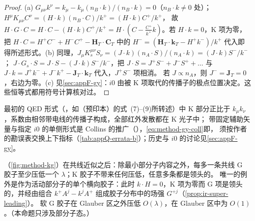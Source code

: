 \begin{proof}
(a) $G_{\mu\nu}k^\nu=k_\mu-k_\mu(n_B\cdot k)/(n_B\cdot k)=0$（$n_B\cdot k\neq0$ 处）；$H^\mu K_{\mu\nu}C^\nu=(H\cdot k)(n_B\cdot C)/k^+=(H\cdot k)C^+/k^+$，
故 $H\cdot G\cdot C=H\cdot C-(H\cdot k)C^+/k^+=H\cdot(C-\frac{C^+}{k^+}k)$。若 $H\cdot k=0$，K 项为零，把 $H\cdot C=H^+C^-+H^-C^+-\mathbf H_T\cdot\mathbf C_T$ 中的
$H^-=(\mathbf H_T\cdot\mathbf k_T-H^+k^-)/k^+$ 代入即得所述形式。(b) 同理，$J_\mu K_s^{\mu\nu}S_\nu=(J\cdot k)(n_A\cdot S)/(n_A\cdot k)=(J\cdot k)S^-/k^-$；
$J\cdot G_s\cdot S=J\cdot S-(J\cdot k)S^-/k^-$，把 $J\cdot S=J^+S^-+J^-S^++\ldots$ 与 $J\cdot k=J^+k^-+J^-k^+-\mathbf J_T\cdot\mathbf k_T$ 代入，$J^+S^-$ 项相消。
若 $J\propto n_A$，则 $J^-=\mathbf J_T=0$，右边为零。(c) 见\cref{sec:appF-gy}：$i0$ 由被 K 项取代的传播子的极点位置决定。这些恒等式都用符号计算核对过。%
\end{proof}

最初的 QED 形式（\cite{GrammerYennie1973}，如\cite{SenIndumathiChoudhury2019}（预印本）的式~(7)--(9)所转述）中 K 部分正比于 $k_\mu k_\nu$，系数由相邻带电线的传播子构成，全部红外发散都在 K 光子中；
带固定辅助矢量与指定 $i0$ 的单侧形式是 Collins 的推广（\cite[第~5.5.6、10.6、11.9.3~节]{Collins2011}），\cref{eq:method-gy-coll}即\cite[式~(11.4)--(11.6)，第~402~页]{Collins2011}，
须按作者的勘误表交换上下指标（\cref{tab:appQ-errata-b}）；历史与 $i0$ 的讨论见\cref{sec:appF-gy}。


\begin{proposition}\label{prop:method-gy-suppression}
（\cref{fig:method-kg}）在共线近似之后：除最小部分子内容之外，每多一条共线 G 胶子至少压低一个 $\lambda$；K 胶子不带来任何压低，任意多条都是领头的。
唯一的例外是作为活动部分子的单个横向胶子：此时 $k\cdot H=0$，K 项为零而 G 项是领头的，并经由组合 $k^+A^j-k^jA^+$ 组成胶子分布中的场强 $G^{+j}$（\cref{prop:ir-super-leading}）。
软 G 胶子在 Glauber 区之外压低 $O(\lambda)$，在 Glauber 区中为 $O(1)$。（本命题只涉及部分子态。）
\end{proposition}

